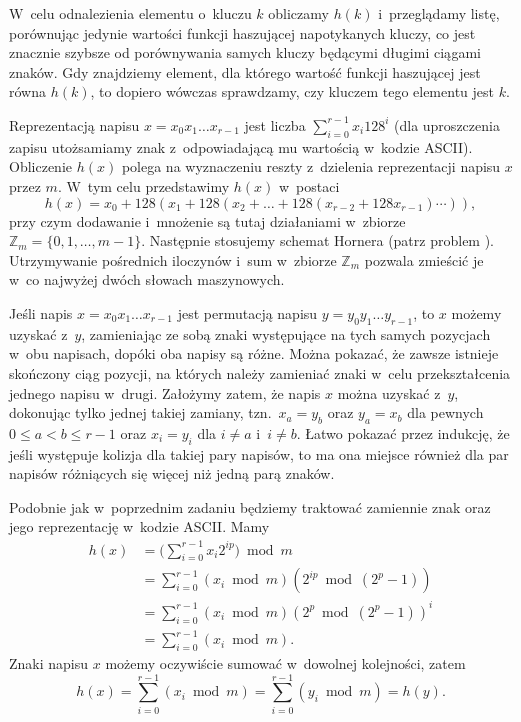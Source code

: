 
\exercise %
W~celu odnalezienia elementu o~kluczu $k$ obliczamy $h(k)$ i~przeglądamy listę, porównując jedynie wartości funkcji haszującej napotykanych kluczy, co jest znacznie szybsze od porównywania samych kluczy będącymi długimi ciągami znaków.
Gdy znajdziemy element, dla którego wartość funkcji haszującej jest równa $h(k)$, to dopiero wówczas sprawdzamy, czy kluczem tego elementu jest $k$.

\exercise %
Reprezentacją napisu $x=x_0x_1\dots x_{r-1}$ jest liczba $\sum_{i=0}^{r-1}x_i128^i$ (dla uproszczenia zapisu utożsamiamy znak z~odpowiadającą mu wartością w~kodzie ASCII).
Obliczenie $h(x)$ polega na wyznaczeniu reszty z~dzielenia reprezentacji napisu $x$ przez $m$.
W~tym celu przedstawimy $h(x)$ w~postaci
\[
	h(x) = x_0+128(x_1+128(x_2+\dots+128(x_{r-2}+128x_{r-1})\cdots)),
\]
przy czym dodawanie i~mnożenie są tutaj działaniami w~zbiorze $\mathbb{Z}_m=\{0,1,\dots,m-1\}$.
Następnie stosujemy schemat Hornera (patrz problem ).
Utrzymywanie pośrednich iloczynów i~sum w~zbiorze $\mathbb{Z}_m$ pozwala zmieścić je w~co najwyżej dwóch słowach maszynowych.

\exercise %
Jeśli napis $x=x_0x_1\dots x_{r-1}$ jest permutacją napisu $y=y_0y_1\dots y_{r-1}$, to $x$ możemy uzyskać z~$y$, zamieniając ze sobą znaki występujące na tych samych pozycjach w~obu napisach, dopóki oba napisy są różne.
Można pokazać, że zawsze istnieje skończony ciąg pozycji, na których należy zamieniać znaki w~celu przekształcenia jednego napisu w~drugi.
Założymy zatem, że napis $x$ można uzyskać z~$y$, dokonując tylko jednej takiej zamiany, tzn.\ $x_a=y_b$ oraz $y_a=x_b$ dla pewnych $0\le a<b\le r-1$ oraz $x_i=y_i$ dla $i\ne a$ i~$i\ne b$.
Łatwo pokazać przez indukcję, że jeśli występuje kolizja dla takiej pary napisów, to ma ona miejsce również dla par napisów różniących się więcej niż jedną parą znaków.

Podobnie jak w~poprzednim zadaniu będziemy traktować zamiennie znak oraz jego reprezentację w~kodzie ASCII\@.
Mamy
\begin{align*}
	h(x) &= \biggl(\sum_{i=0}^{r-1}x_i2^{ip}\biggr)\bmod m \\
	&= \sum_{i=0}^{r-1}(x_i\bmod m)(2^{ip}\bmod(2^p-1)) \\
	&= \sum_{i=0}^{r-1}(x_i\bmod m)(2^p\bmod(2^p-1))^i \\
	&= \sum_{i=0}^{r-1}(x_i\bmod m).
\end{align*}
Znaki napisu $x$ możemy oczywiście sumować w~dowolnej kolejności, zatem
\[
	h(x) = \sum_{i=0}^{r-1}(x_i\bmod m) = \sum_{i=0}^{r-1}(y_i\bmod m) = h(y).
\]


